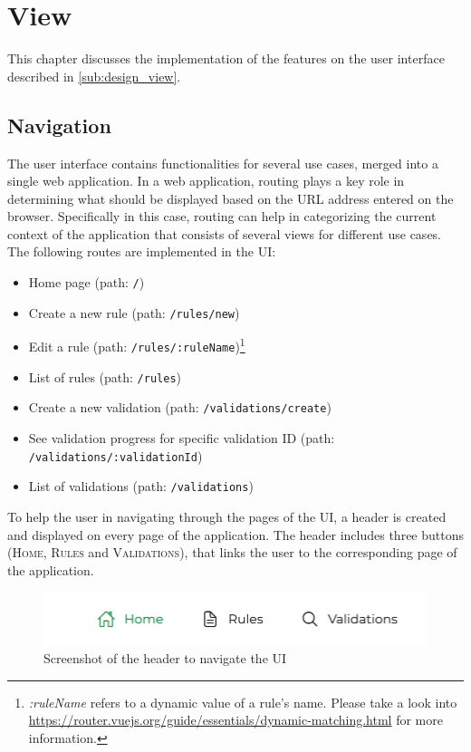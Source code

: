 \section{View}

  This chapter discusses the implementation of the features on the user interface described in \autoref{sub:design_view}.

  \subsection{Navigation}
  
    The user interface contains functionalities for several use cases, merged into a single web application. In a web application, routing plays a key role in determining what should be displayed based on the URL address entered on the browser. Specifically in this case, routing can help in categorizing the current context of the application that consists of several views for different use cases. The following routes are implemented in the UI:

    \begin{itemize}
     \item Home page (path: \verb;/;)
     \item Create a new rule (path: \verb;/rules/new;)
     \item Edit a rule (path: \verb;/rules/:ruleName;)\footnote{\emph{:ruleName} refers to a dynamic value of a rule's name. Please take a look into \url{https://router.vuejs.org/guide/essentials/dynamic-matching.html} for more information.}
     \item List of rules (path: \verb;/rules;)
     \item Create a new validation (path: \verb;/validations/create;)
     \item See validation progress for specific validation ID (path: \verb;/validations/:validationId;)
     \item List of validations (path: \verb;/validations;)
    \end{itemize}
    
    To help the user in navigating through the pages of the UI, a header is created and displayed on every page of the application. The header includes three buttons (\textsc{Home, Rules} and \textsc{Validations}), that links the user to the corresponding page of the application. 

    \begin{figure}[!ht]
     \includegraphics[width=\textwidth]{images/ss_navigation.jpeg}
     \caption{Screenshot of the header to navigate the UI}
    \end{figure}

